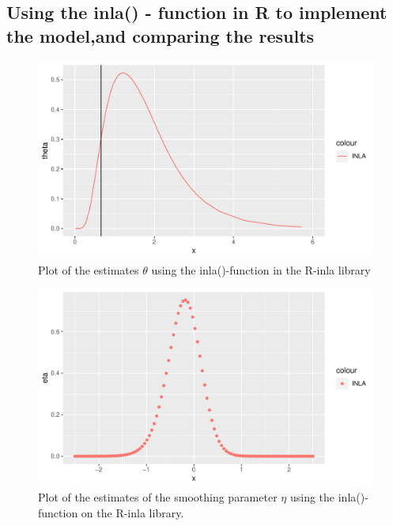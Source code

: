 \subsection{Using the inla() - function in R to implement the model,and comparing the results}


\begin{figure}[h]
    \centering
    \includegraphics{Images/R_inla_theta.pdf}
    \caption{Plot of the estimates $\theta$ using the inla()-function in the R-inla library}
    \label{fig:r_inla_theta}
\end{figure}

\begin{figure}[h]
    \centering
    \includegraphics{Images/R_inla_eta.pdf}
    \caption{Plot of the estimates of the smoothing parameter $\eta$ using the inla()-function on the R-inla library.}
    \label{fig:r_inla_eta}
\end{figure}

